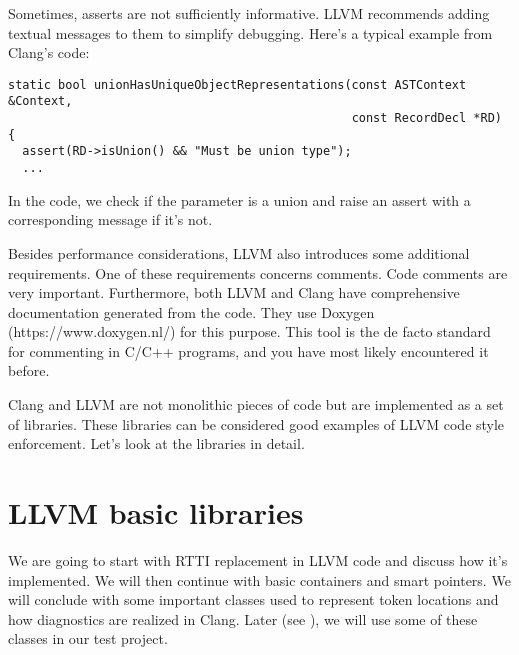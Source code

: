 Sometimes, asserts are not sufficiently informative. LLVM recommends adding
textual messages to them to simplify debugging. Here's a typical example from
Clang's code: 
\begin{verbatim}
static bool unionHasUniqueObjectRepresentations(const ASTContext &Context,
                                                const RecordDecl *RD) {
  assert(RD->isUnion() && "Must be union type");
  ...
\end{verbatim}
In the code, we check if the parameter is a union and raise an assert with a
corresponding message if it's not. 

Besides performance considerations, LLVM also introduces some additional
requirements. One of these requirements concerns comments. Code comments are
very important. Furthermore, both LLVM and Clang have comprehensive
documentation generated from the code. They use Doxygen
(https://www.doxygen.nl/) for this purpose. This tool is the de facto standard
for commenting in C/C++ programs, and you have most likely encountered it
before. 

Clang and LLVM are not monolithic pieces of code but are implemented as a set of
libraries. These libraries can be considered good examples of LLVM code style
enforcement. Let's look at the libraries in detail. 

\section{LLVM basic libraries}
We are going to start with RTTI replacement in LLVM code and discuss how it's
implemented. We will then continue with basic containers and smart pointers. We
will conclude with some important classes used to represent token locations and
how diagnostics are realized in Clang. Later (see
), we will use some of these classes in our
test project. 

